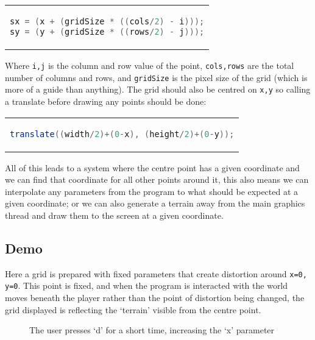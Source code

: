 \begin{center}
\begin{tabular}{c}
\begin{lstlisting}[language=java]
sx = (x + (gridSize * ((cols/2) - i)));
sy = (y + (gridSize * ((rows/2) - j)));
\end{lstlisting}
\end{tabular}
\end{center}

Where \verb|i,j| is the column and row value of the point, \verb|cols,rows|
are the total number of columns and rows, and \verb|gridSize| is the pixel size
of the grid (which is more of a guide than anything). The grid should also
be centred on \verb|x,y| so calling a translate before drawing any points should
be done:

\begin{center}
\begin{tabular}{c}
\begin{lstlisting}[language=java]
translate((width/2)+(0-x), (height/2)+(0-y));
\end{lstlisting}
\end{tabular}
\end{center}

All of this leads to a system where the centre point has a given coordinate and
we can find that coordinate for all other points around it, this also means we
can interpolate any parameters from the program to what should be expected at a
given coordinate; or we can also generate a terrain away from the main graphics
thread and draw them to the screen at a given coordinate.

\subsection{Demo}
Here a grid is prepared with fixed parameters that create distortion around
\verb|x=0, y=0|. This point is fixed, and when the program is interacted with
the world moves beneath the player rather than the point of distortion being
changed, the grid displayed is reflecting the `terrain' visible from the centre
point.

\begin{figure}[h!]
\centering
{}%
\hspace*{2cm}%
\caption{The user presses `d' for a short time, increasing the `x' parameter}
\label{demomovement}
\end{figure}


